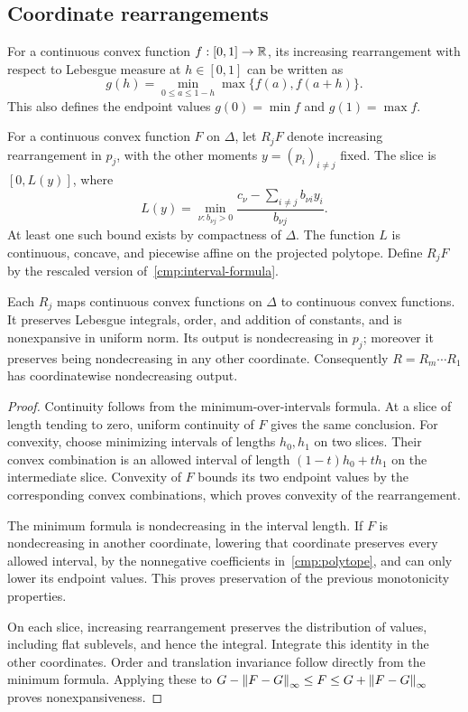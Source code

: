 \subsection{Coordinate rearrangements}

For a continuous convex function \(f:[0,1]\to\mathbb R\), its increasing
rearrangement with respect to Lebesgue measure at \(h\in[0,1]\)
can be written as
\begin{equation}\label{cmp:interval-formula}
 g(h)=\min_{0\le a\le1-h}\max\{f(a),f(a+h)\}.
\end{equation}
This also defines the endpoint values \(g(0)=\min f\) and
\(g(1)=\max f\).

For a continuous convex function \(F\) on \(\Delta\), let \(R_jF\)
denote increasing rearrangement in \(p_j\), with the other moments
\(y=(p_i)_{i\ne j}\) fixed. The slice is \([0,L(y)]\), where
\[
 L(y)=
 \min_{\nu:b_{\nu j}>0}
 \frac{c_\nu-\sum_{i\ne j}b_{\nu i}y_i}{b_{\nu j}}.
\]
At least one such bound exists by compactness of \(\Delta\).
The function \(L\) is continuous, concave, and piecewise affine
on the projected polytope. Define \(R_jF\) by the rescaled version
of~\eqref{cmp:interval-formula}.

\begin{lemma}\label{cmp:rearrangement-properties}
Each \(R_j\) maps continuous convex functions on \(\Delta\) to
continuous convex functions. It preserves Lebesgue integrals,
order, and addition of constants, and is nonexpansive in uniform
norm. Its output is nondecreasing in \(p_j\); moreover it preserves
being nondecreasing in any other coordinate.
Consequently \(R=R_m\cdots R_1\) has coordinatewise nondecreasing
output.
\end{lemma}

\begin{proof}
Continuity follows from the minimum-over-intervals formula. At a
slice of length tending to zero, uniform continuity of \(F\) gives
the same conclusion. For convexity, choose minimizing intervals
of lengths \(h_0,h_1\) on two slices. Their convex combination is
an allowed interval of length \((1-t)h_0+th_1\) on the intermediate
slice. Convexity of \(F\) bounds its two endpoint values by the
corresponding convex combinations, which proves convexity of
the rearrangement.

The minimum formula is nondecreasing in the interval length.
If \(F\) is nondecreasing in another coordinate, lowering that
coordinate preserves every allowed interval, by the nonnegative
coefficients in~\eqref{cmp:polytope}, and can only lower its
endpoint values. This proves preservation of the previous
monotonicity properties.

On each slice, increasing rearrangement preserves the distribution
of values, including flat sublevels, and hence the integral.
Integrate this identity in the other coordinates.
Order and translation invariance follow directly from the
minimum formula. Applying these to
\(G-\left\lVert F-G\right\rVert_\infty\le F\le G+\left\lVert F-G\right\rVert_\infty\)
proves nonexpansiveness.
\end{proof}

